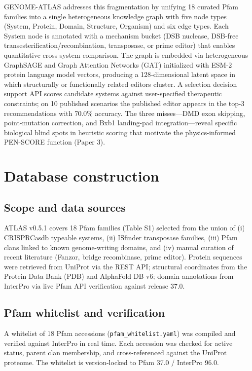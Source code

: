 \documentclass[11pt,a4paper]{article}
\begin{document}
GENOME-ATLAS addresses this fragmentation by unifying 18 curated Pfam families into a single heterogeneous knowledge graph with five node types (System, Protein, Domain, Structure, Organism) and six edge types. Each System node is annotated with a mechanism bucket (DSB nuclease, DSB-free transesterification/recombination, transposase, or prime editor) that enables quantitative cross-system comparison. The graph is embedded via heterogeneous GraphSAGE and Graph Attention Networks (GAT) initialized with ESM-2 protein language model vectors, producing a 128-dimensional latent space in which structurally or functionally related editors cluster. A selection decision support API scores candidate systems against user-specified therapeutic constraints; on 10 published scenarios the published editor appears in the top-3 recommendations with 70.0\% accuracy. The three misses---DMD exon skipping, point-mutation correction, and Bxb1 landing-pad integration---reveal specific biological blind spots in heuristic scoring that motivate the physics-informed PEN-SCORE function (Paper 3).

\section*{Database construction}

\subsection*{Scope and data sources}
ATLAS v0.5.1 covers 18 Pfam families (Table S1) selected from the union of (i) CRISPRCasdb typeable systems, (ii) ISfinder transposase families, (iii) Pfam clans linked to known genome-writing domains, and (iv) manual curation of recent literature (Fanzor, bridge recombinase, prime editor). Protein sequences were retrieved from UniProt via the REST API; structural coordinates from the Protein Data Bank (PDB) and AlphaFold DB v6; domain annotations from InterPro via live Pfam API verification against release 37.0.

\subsection*{Pfam whitelist and verification}
A whitelist of 18 Pfam accessions (\texttt{pfam\_whitelist.yaml}) was compiled and verified against InterPro in real time. Each accession was checked for active status, parent clan membership, and cross-referenced against the UniProt proteome. The whitelist is version-locked to Pfam 37.0 / InterPro 96.0.
\end{document}
